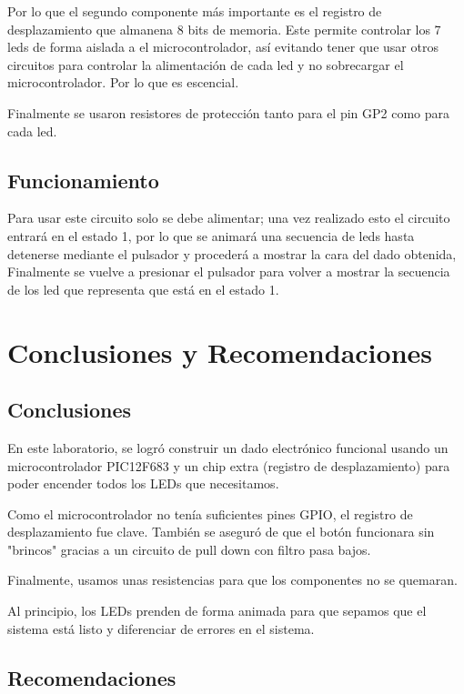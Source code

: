 \documentclass[12pt,a4paper]{article}
\begin{document}
  Por lo que el segundo componente más importante es el registro de desplazamiento que
  almanena 8 bits de memoria. Este permite controlar los 7 leds de forma aislada a el 
  microcontrolador, así evitando tener que usar otros circuitos para controlar la alimentación
  de cada led y no sobrecargar el microcontrolador. Por lo que es escencial.

  Finalmente se usaron resistores de protección tanto para el pin GP2 como para cada led.

\subsection{Funcionamiento}

Para usar este circuito solo se debe alimentar; una vez realizado esto el circuito entrará
en el estado 1, por lo que se animará una secuencia de leds hasta detenerse mediante el pulsador
y procederá a mostrar la cara del dado obtenida, Finalmente se vuelve a presionar el pulsador
para volver a mostrar la secuencia de los led que representa que está en el estado 1.



\section{Conclusiones y Recomendaciones}

\subsection{Conclusiones}

En este laboratorio, se logró construir un dado electrónico
funcional usando un microcontrolador PIC12F683 y un chip
extra (registro de desplazamiento) para poder encender
todos los LEDs que necesitamos. 

Como el microcontrolador no
tenía suficientes pines GPIO, el registro de
desplazamiento fue clave.
También se aseguró de que el botón funcionara sin "brincos" gracias a un
circuito de pull down con filtro pasa bajos.

Finalmente, usamos unas resistencias para
que los componentes no se quemaran. 

Al principio, los
LEDs prenden de forma animada para que sepamos que el
sistema está listo y diferenciar de errores en el sistema.

\subsection{Recomendaciones}
\end{document}
